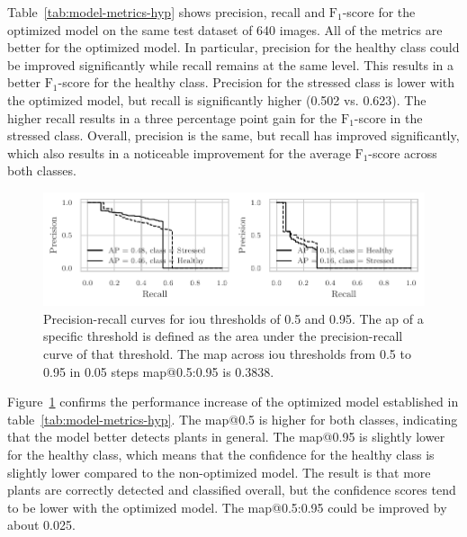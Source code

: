 \documentclass[final]{vutinfth} %
\begin{document}
Table~\ref{tab:model-metrics-hyp} shows precision, recall and
$\mathrm{F}_1$-score for the optimized model on the same test dataset
of \num{640} images. All of the metrics are better for the optimized
model. In particular, precision for the healthy class could be
improved significantly while recall remains at the same level. This
results in a better $\mathrm{F}_1$-score for the healthy
class. Precision for the stressed class is lower with the optimized
model, but recall is significantly higher (\num{0.502}
vs. \num{0.623}). The higher recall results in a three percentage
point gain for the $\mathrm{F}_1$-score in the stressed
class. Overall, precision is the same, but recall has improved
significantly, which also results in a noticeable improvement for the
average $\mathrm{F}_1$-score across both classes.

\begin{figure}
  \centering
  \includegraphics{graphics/APModel-model-original-relabeled.pdf}
  \caption[Optimized aggregate model AP@0.5 and
  AP@0.95.]{Precision-recall curves for \gls{iou} thresholds of
    \num{0.5} and \num{0.95}. The \gls{ap} of a specific threshold is
    defined as the area under the precision-recall curve of that
    threshold. The \gls{map} across \gls{iou} thresholds from
    \num{0.5} to \num{0.95} in \num{0.05} steps \gls{map}@0.5:0.95 is
    \num{0.3838}.}
  \label{fig:aggregate-ap-hyp}
\end{figure}

Figure~\ref{fig:aggregate-ap-hyp} confirms the performance increase of
the optimized model established in
table~\ref{tab:model-metrics-hyp}. The \gls{map}@0.5 is higher for
both classes, indicating that the model better detects plants in
general. The \gls{map}@0.95 is slightly lower for the healthy class,
which means that the confidence for the healthy class is slightly
lower compared to the non-optimized model. The result is that more
plants are correctly detected and classified overall, but the
confidence scores tend to be lower with the optimized model. The
\gls{map}@0.5:0.95 could be improved by about \num{0.025}.
\end{document}
